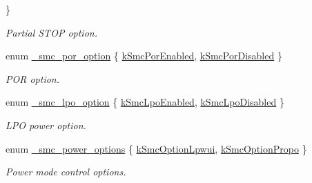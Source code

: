 \begin{DoxyCompactItemize}
 \}\begin{DoxyCompactList}\small\item\em Partial S\+T\+OP option. \end{DoxyCompactList}
\item 
enum \hyperlink{group__smc__hal_ga31c58c747f4a95851a1b6a0b73e81078}{\+\_\+smc\+\_\+por\+\_\+option} \{ \hyperlink{group__smc__hal_gga31c58c747f4a95851a1b6a0b73e81078a12db8e0816846604a2c1646fc80dcbed}{k\+Smc\+Por\+Enabled}, 
\hyperlink{group__smc__hal_gga31c58c747f4a95851a1b6a0b73e81078a9ec6b8faac0eb3f28b07aae4fef199f3}{k\+Smc\+Por\+Disabled}
 \}\begin{DoxyCompactList}\small\item\em P\+OR option. \end{DoxyCompactList}
\item 
enum \hyperlink{group__smc__hal_ga7e05ac2b62300e11b27f08ba5f8f5162}{\+\_\+smc\+\_\+lpo\+\_\+option} \{ \hyperlink{group__smc__hal_gga7e05ac2b62300e11b27f08ba5f8f5162a7833f07cbdf21c56cac0588be72963cd}{k\+Smc\+Lpo\+Enabled}, 
\hyperlink{group__smc__hal_gga7e05ac2b62300e11b27f08ba5f8f5162a4d1b11bbc8a3a05d21f07433de9222d0}{k\+Smc\+Lpo\+Disabled}
 \}\begin{DoxyCompactList}\small\item\em L\+PO power option. \end{DoxyCompactList}
\item 
enum \hyperlink{group__smc__hal_ga286330695ac8bf94e6303a37f16a9a26}{\+\_\+smc\+\_\+power\+\_\+options} \{ \hyperlink{group__smc__hal_gga286330695ac8bf94e6303a37f16a9a26a2d6e9a8d8393cce9cba910c1e4f2cedd}{k\+Smc\+Option\+Lpwui}, 
\hyperlink{group__smc__hal_gga286330695ac8bf94e6303a37f16a9a26a1fef15b24657659e778efc4ed93e66a5}{k\+Smc\+Option\+Propo}
 \}\begin{DoxyCompactList}\small\item\em Power mode control options. \end{DoxyCompactList}
\end{DoxyCompactItemize}
